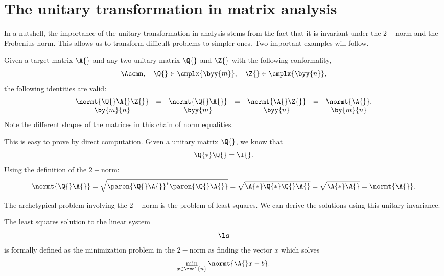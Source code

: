 \section[Matrix analysis]{The unitary transformation in matrix analysis}

In a nutshell, the importance of the unitary transformation in analysis stems from the fact that it is invariant under the $2-$norm and the Frobenius norm. This allows us to transform difficult problems to simpler ones. Two important examples will follow.

Given a target matrix $\A{}$ and any two unitary matrix $\Q{}$ and $\Z{}$ with the following conformality,
\begin{equation*}
   \Accmn,  \quad \Q{}\in\cmplx{\byy{m}},  \quad \Z{}\in\cmplx{\byy{n}},
\end{equation*}
the following identities are valid:
\begin{equation}
  \begin{array}{ccccccc}
     \normt{\Q{}\A{}\Z{}} &=& \normt{\Q{}\A{}} &=& \normt{\A{}\Z{}} &=& \normt{\A{}},\\
       \by{m}{n} && \byy{m} && \byy{n} && \by{m}{n}
  \end{array}
\end{equation}
Note the different shapes of the matrices in this chain of norm equalities.

This is easy to prove by direct computation. Given a unitary matrix $\Q{}$, we know that
\begin{equation}
\Q{*}\Q{} = \I{}.  
\end{equation} 
Using the definition of the $2-$norm:
\begin{equation}
  \normt{\Q{}\A{}} = \sqrt{\paren{\Q{}\A{}}^{*}\paren{\Q{}\A{}}} = \sqrt{\A{*}\Q{*}\Q{}\A{}} = \sqrt{\A{*}\A{}} = \normt{\A{}}.
\end{equation}

The archetypical problem involving the $2-$norm is the problem of least squares. We can derive the solutions using this unitary invariance.

The least squares solution to the linear system
\begin{equation}
  \ls
\end{equation}
is formally defined as the minimization problem in the $2-$norm as finding the vector $x$ which solves
\begin{equation}
  \min\limits_{x\in\real{n}} \normt{\A{}x-b}.
\end{equation}

